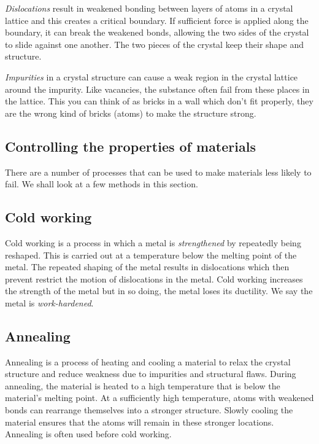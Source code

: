 \emph{Dislocations} result in weakened bonding between layers of atoms in a crystal lattice and this creates a critical boundary. If sufficient force is applied along the boundary, it can break the weakened bonds, allowing the two sides of the crystal to slide against one another. The two pieces of the crystal keep their shape and structure.

\emph{Impurities} in a crystal structure can cause a weak region in the crystal lattice around the impurity. Like vacancies, the substance often fail from these places in the lattice. This you can think of as bricks in a wall which don't fit properly, they are the wrong kind of bricks (atoms) to make the structure strong.


\subsection{Controlling the properties of materials}

There are a number of processes that can be used to make materials less likely to fail. We shall look at a few methods in this section.
\subsection*{Cold working}

Cold working is a process in which a metal is \emph{strengthened} by repeatedly being reshaped. This is carried out at a temperature below the melting point of the metal. The repeated shaping of the metal results in dislocations which then prevent restrict the motion of dislocations in the metal. Cold working increases the strength of the metal but in so doing, the metal loses its ductility. We say the metal is \emph{work-hardened}.\\

\subsection*{Annealing}
Annealing is a process of heating and cooling a material to relax the crystal structure and reduce weakness due to impurities and structural flaws. 
During annealing, the material is heated to a high temperature that is below the material's melting point. At a sufficiently high temperature, atoms with weakened bonds can rearrange themselves into a stronger structure. Slowly cooling the material ensures that the atoms will remain in these stronger locations. Annealing is often used before cold working. 
 
